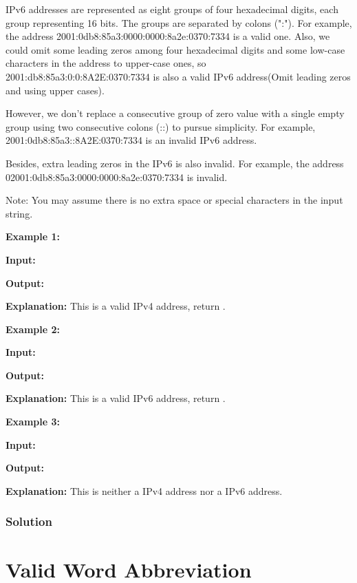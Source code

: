 IPv6 addresses are represented as eight groups of four hexadecimal digits, each group representing 16 bits. The groups are separated by colons (":"). For example, the address 2001:0db8:85a3:0000:0000:8a2e:0370:7334 is a valid one. Also, we could omit some leading zeros among four hexadecimal digits and some low-case characters in the address to upper-case ones, so 2001:db8:85a3:0:0:8A2E:0370:7334 is also a valid IPv6 address(Omit leading zeros and using upper cases).

However, we don't replace a consecutive group of zero value with a single empty group using two consecutive colons (::) to pursue simplicity. For example, 2001:0db8:85a3::8A2E:0370:7334 is an invalid IPv6 address.

Besides, extra leading zeros in the IPv6 is also invalid. For example, the address 02001:0db8:85a3:0000:0000:8a2e:0370:7334 is invalid.

Note: You may assume there is no extra space or special characters in the input string.

\textbf{Example 1:}

\textbf{Input:} 

\textbf{Output:} 

\textbf{Explanation:} This is a valid IPv4 address, return .

\textbf{Example 2:}

\textbf{Input:} 

\textbf{Output:} 

\textbf{Explanation:} This is a valid IPv6 address, return .

\textbf{Example 3:}

\textbf{Input:} 

\textbf{Output:} 

\textbf{Explanation:} This is neither a IPv4 address nor a IPv6 address.

\subsubsection{Solution}

\begin{Code}

\end{Code}

\newpage

\section{Valid Word Abbreviation} %

